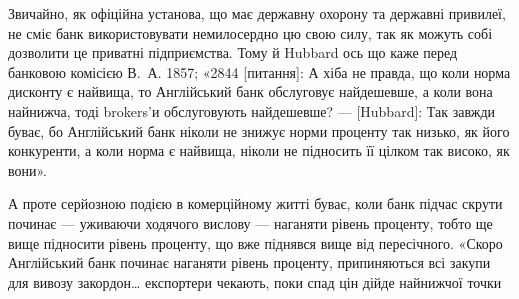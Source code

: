 Звичайно, як офіційна установа, що має державну охорону та державні
привилеї, не сміє банк використовувати немилосердно цю свою силу, так як
можуть собі дозволити це приватні підприємства. Тому й Hubbard ось що каже
перед банковою комісією В.~А. 1857; «2844 [питання]: А хіба не правда, що
коли норма дисконту є найвища, то Англійський банк обслуговує найдешевше,
а коли вона найнижча, тоді brokers’и обслуговують найдешевше? — [Hubbard]:
Так завжди буває, бо Англійський банк ніколи не знижує норми проценту так
низько, як його конкуренти, а коли норма є найвища, ніколи не підносить її
цілком так високо, як вони».

А проте серйозною подією в комерційному житті буває, коли банк підчас
скрути починає — уживаючи ходячого вислову — наганяти рівень проценту, тобто
ще вище підносити рівень проценту, що вже піднявся вище від пересічного. «Скоро
Англійський банк починає наганяти рівень проценту, припиняються всі закупи
для вивозу закордон\dots{} експортери чекають, поки спад цін дійде найнижчої точки
\parbreak{}  %
